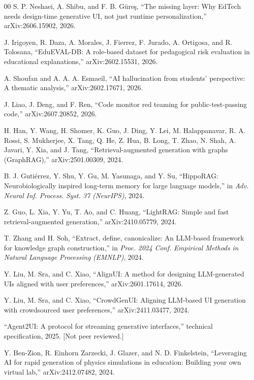 \documentclass[conference]{IEEEtran}
\begin{document}
\begin{thebibliography}{00}
 S. P. Neshaei, A. Shibu, and F. B. G\"ure\c{s}, ``The missing layer: Why EdTech needs design-time generative UI, not just runtime personalization,'' arXiv:2606.15902, 2026.

 J. Irigoyen, R. Daza, A. Morales, J. Fierrez, F. Jurado, A. Ortigosa, and R. Tolosana, ``EduEVAL-DB: A role-based dataset for pedagogical risk evaluation in educational explanations,'' arXiv:2602.15531, 2026.

 A. Shoufan and A. A. A. Esmaeil, ``AI hallucination from students' perspective: A thematic analysis,'' arXiv:2602.17671, 2026.

 J. Liao, J. Deng, and F. Ren, ``Code monitor red teaming for public-test-passing code,'' arXiv:2607.20852, 2026.

 H. Han, Y. Wang, H. Shomer, K. Guo, J. Ding, Y. Lei, M. Halappanavar, R. A. Rossi, S. Mukherjee, X. Tang, Q. He, Z. Hua, B. Long, T. Zhao, N. Shah, A. Javari, Y. Xia, and J. Tang, ``Retrieval-augmented generation with graphs (GraphRAG),'' arXiv:2501.00309, 2024.

 B. J. Guti\'errez, Y. Shu, Y. Gu, M. Yasunaga, and Y. Su, ``HippoRAG: Neurobiologically inspired long-term memory for large language models,'' in \emph{Adv. Neural Inf. Process. Syst. 37 (NeurIPS)}, 2024.

 Z. Guo, L. Xia, Y. Yu, T. Ao, and C. Huang, ``LightRAG: Simple and fast retrieval-augmented generation,'' arXiv:2410.05779, 2024.

 T. Zhang and H. Soh, ``Extract, define, canonicalize: An LLM-based framework for knowledge graph construction,'' in \emph{Proc. 2024 Conf. Empirical Methods in Natural Language Processing (EMNLP)}, 2024.

 Y. Liu, M. Sra, and C. Xiao, ``AlignUI: A method for designing LLM-generated UIs aligned with user preferences,'' arXiv:2601.17614, 2026.

 Y. Liu, M. Sra, and C. Xiao, ``CrowdGenUI: Aligning LLM-based UI generation with crowdsourced user preferences,'' arXiv:2411.03477, 2024.

 ``Agent2UI: A protocol for streaming generative interfaces,'' technical specification, 2025. [Not peer reviewed.]

 Y. Ben-Zion, R. Einhorn Zarzecki, J. Glazer, and N. D. Finkelstein, ``Leveraging AI for rapid generation of physics simulations in education: Building your own virtual lab,'' arXiv:2412.07482, 2024.


\end{thebibliography}
\end{document}
